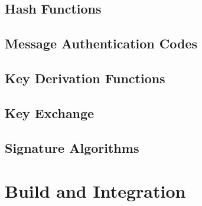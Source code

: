 \documentclass[11pt,a4paper]{report}
\theoremstyle{definitionstyle}
\begin{document}
\section{Hash Functions}

\section{Message Authentication Codes}

\section{Key Derivation Functions}

\section{Key Exchange}

\section{Signature Algorithms}

\chapter{Build and Integration}
\end{document}
